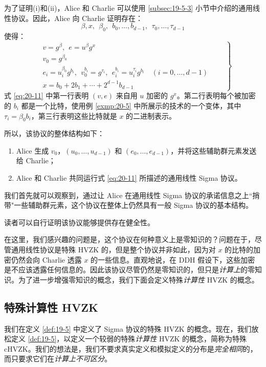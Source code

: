 为了证明(i)和(ii)，Alice 和 Charlie 可以使用 \ref{subsec:19-5-3} 小节中介绍的通用线性协议。因此，Alice 向 Charlie 证明存在：
$$
\beta,x,~~
\beta_0,~~
b_0,\dots,b_{d-1},~~
\tau_0,\dots,\tau_{d-1}
$$
使得：
\begin{equation}\label{eq:20-11}
\left.
\begin{aligned}
& v=g^\beta,~~e=u^\beta g^x\\
& v_0=g^{\beta_0}\\
& e_i=u_i^{\beta_0}g^{b_i},~~v_0^{b_i}=g^{\tau_i},~~e_i^{b_i}=u_i^{\tau_i}g^{b_i}\quad(i=0,\dots,d-1)\\
& x=b_0+2b_1+\cdots+2^{d-1}b_{d-1}
\end{aligned}
\quad\quad
\right\}
\end{equation}
式 \ref{eq:20-11} 中第一行表明 $(v,e)$ 来自用 $u$ 加密的 $g^x$。第二行表明每个被加密的 $b_i$ 都是一个比特，使用例 \ref{exmp:20-5} 中所展示的技术的一个变体，其中 $\tau_i=\beta_0b_i$，第三行表明这些比特就是 $x$ 的二进制表示。

所以，该协议的整体结构如下：
\begin{enumerate}
	\item Alice 生成 $v_0$，$(u_0,\dots,u_{d-1})$ 和 $(e_0,\dots,e_{d-1})$，并将这些辅助群元素发送给 Charlie；
	\item Alice 和 Charlie 共同运行式 \ref{eq:20-11} 所描述的通用线性 Sigma 协议。
\end{enumerate}

我们首先就可以观察到，通过让 Alice 在通用线性 Sigma 协议的承诺信息之上``捎带"一些辅助群元素，这个协议在整体上仍然具有一般 Sigma 协议的基本结构。

读者可以自行证明该协议能够提供存在健全性。

在这里，我们感兴趣的问题是，这个协议在何种意义上是零知识的？问题在于，尽管通用线性协议是特殊 HVZK 的，但是整个协议并非如此，因为对 $x$ 的比特的加密仍然会向 Charlie 透露 $x$ 的一些信息。直观地说，在 DDH 假设下，这些加密是不应该透露任何信息的。因此该协议尽管仍然是零知识的，但只是\emph{计算上}的零知识。为了进一步增强零知识的概念，我们下面会定义特殊\emph{计算性} HVZK 的概念。

\subsection{特殊计算性 HVZK}

我们在定义 \ref{def:19-5} 中定义了 Sigma 协议的特殊 HVZK 的概念。现在，我们放松定义 \ref{def:19-5}，以定义一个较弱的特殊\emph{计算性} HVZK 的概念，简称为特殊 cHVZK。我们的想法是，我们不要求真实定义和模拟定义的分布是\emph{完全相同}的，而只要求它们在\emph{计算上不可区分}。

